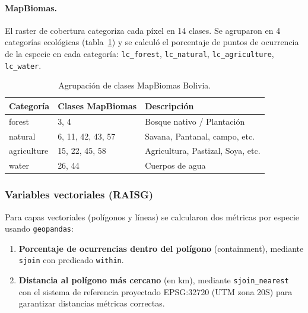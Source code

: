 \documentclass[12pt,a4paper]{article}
\begin{document}
\paragraph{MapBiomas.}
El raster de cobertura categoriza cada píxel en 14 clases.
Se agruparon en 4 categorías ecológicas (tabla~\ref{tab:mapbiomas}) y se calculó el porcentaje
de puntos de ocurrencia de la especie en cada categoría:
\texttt{lc\_forest}, \texttt{lc\_natural}, \texttt{lc\_agriculture}, \texttt{lc\_water}.

\begin{table}[H]
  \centering\small
  \caption{Agrupación de clases MapBiomas Bolivia.}
  \label{tab:mapbiomas}
  \begin{tabular}{lll}
    \toprule
    \textbf{Categoría} & \textbf{Clases MapBiomas} & \textbf{Descripción} \\
    \midrule
    forest      & 3, 4           & Bosque nativo / Plantación \\
    natural     & 6, 11, 42, 43, 57 & Savana, Pantanal, campo, etc. \\
    agriculture & 15, 22, 45, 58 & Agricultura, Pastizal, Soya, etc. \\
    water       & 26, 44         & Cuerpos de agua \\
    \bottomrule
  \end{tabular}
\end{table}

\subsubsection{Variables vectoriales (RAISG)}

Para capas vectoriales (polígonos y líneas) se calcularon dos métricas por especie usando
\texttt{geopandas}:
\begin{enumerate}[nosep]
  \item \textbf{Porcentaje de ocurrencias dentro del polígono} (containment), mediante
        \texttt{sjoin} con predicado \texttt{within}.
  \item \textbf{Distancia al polígono más cercano} (en km), mediante \texttt{sjoin\_nearest}
        con el sistema de referencia proyectado EPSG:32720 (UTM zona 20S) para garantizar
        distancias métricas correctas.
\end{enumerate}
\end{document}
